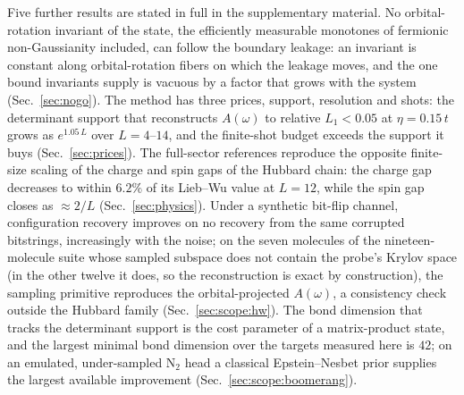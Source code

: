 Five further results are stated in full in the supplementary material. No orbital-rotation invariant
of the state, the efficiently measurable monotones of fermionic non-Gaussianity included, can follow
the boundary leakage: an invariant is constant along orbital-rotation fibers on which the leakage
moves, and the one bound invariants supply is vacuous by a factor that grows with the system
(Sec.~\ref{sec:nogo}). The method has three prices, support, resolution and shots: the
determinant support that reconstructs $A(\omega)$ to relative $L_1<0.05$ at $\eta=0.15\,t$ grows as
$e^{1.05\,L}$ over $L=4$--$14$, %
%
and the finite-shot budget exceeds the support it buys
(Sec.~\ref{sec:prices}). The full-sector references reproduce the opposite finite-size scaling of
the charge and spin gaps of the Hubbard chain: the charge gap decreases to within $6.2\%$ of its
Lieb--Wu value at $L=12$, while the spin gap closes as $\approx2/L$ (Sec.~\ref{sec:physics}). Under
a synthetic bit-flip channel, configuration recovery improves on no recovery from the same
corrupted bitstrings, increasingly with the noise; on the seven molecules of the nineteen-molecule
suite whose sampled subspace does not contain the probe's Krylov space (in the other twelve it does,
so the reconstruction is exact by construction), the sampling primitive reproduces the orbital-projected $A(\omega)$, a consistency check outside the
Hubbard family (Sec.~\ref{sec:scope:hw}). The bond dimension that tracks the determinant support is
the cost parameter of a matrix-product state, and the largest minimal bond dimension over the
targets measured here is $42$; on an emulated, under-sampled $\mathrm{N_2}$ head a classical
Epstein--Nesbet prior supplies the largest available improvement (Sec.~\ref{sec:scope:boomerang}).


